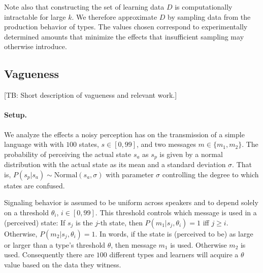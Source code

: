 \documentclass[10pt,a4paper]{article}
\newcommand{\tb}[1]{\textcolor[rgb]{.8,.33,.0}{[TB: #1]}}%
\begin{document}
Note also that constructing the set of learning data $D$ is computationally intractable for large $k$. We therefore approximate $D$ by sampling data from the production behavior of types. The values chosen correspond to experimentally determined amounts that minimize the effects that insufficient sampling may otherwise introduce. 

\subsection{Vagueness}
\tb{Short description of vagueness and relevant work.}

\paragraph{Setup.} We analyze the effects a noisy perception has on the transmission of a simple language with with $100$ states, $s \in [0,99]$, and two messages $m \in \{m_1,m_2\}$. The probability of perceiving the actual state $s_a$ as $s_p$ is given by a normal distribution with the actual state as its mean and a standard deviation $\sigma$. That is, $P(s_p | s_a) \sim \text{Normal}(s_{a},\sigma)$ with parameter $\sigma$ controlling the degree to which states are confused. 

Signaling behavior is assumed to be uniform across speakers and to depend solely on a threshold $\theta_i$, $i \in [0,99]$. This threshold controls which message is used in a (perceived) state: If $s_j$ is the $j$-th state, then $P(m_1|s_j,\theta_i) = 1$ iff $j \geq i$. Otherwise, $P(m_2|s_j,\theta_i) = 1$. In words, if the state is (perceived to be) as large or larger than a type's threshold $\theta$, then message $m_1$ is used. Otherwise $m_2$ is used. Consequently there are $100$ different types and learners will acquire a $\theta$ value based on the data they witness.
\end{document}
